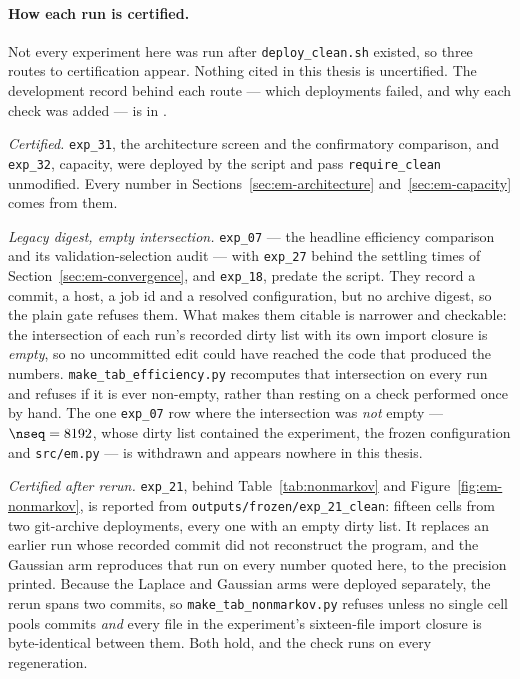 \paragraph{How each run is certified.} Not every experiment here was run after
\texttt{deploy\_clean.sh} existed, so three routes to certification appear.
Nothing cited in this thesis is uncertified. The development record behind each
route --- which deployments failed, and why each check was added --- is in
\compendium{}.

\emph{Certified.} \texttt{exp\_31}, the architecture screen and the
confirmatory comparison, and \texttt{exp\_32}, capacity, were deployed by the
script and pass \texttt{require\_clean} unmodified. Every number in
Sections~\ref{sec:em-architecture} and~\ref{sec:em-capacity} comes from them.

\emph{Legacy digest, empty intersection.} \texttt{exp\_07} --- the headline
efficiency comparison and its validation-selection audit --- with
\texttt{exp\_27} behind the settling times of
Section~\ref{sec:em-convergence}, and \texttt{exp\_18}, predate the script.
They record a commit, a host, a job id and a resolved configuration, but no
archive digest, so the plain gate refuses them. What makes them citable is
narrower and checkable: the intersection of each run's recorded dirty list with
its own import closure is \emph{empty}, so no uncommitted edit could have
reached the code that produced the numbers.
\texttt{make\_tab\_efficiency.py} recomputes that intersection on every run
and refuses if it is ever non-empty, rather than resting on a check performed
once by hand. The one \texttt{exp\_07} row where the intersection was
\emph{not} empty --- $\nseq = 8192$, whose dirty list contained the
experiment, the frozen configuration and \texttt{src/em.py} --- is withdrawn
and appears nowhere in this thesis.

\emph{Certified after rerun.} \texttt{exp\_21}, behind
Table~\ref{tab:nonmarkov} and Figure~\ref{fig:em-nonmarkov}, is reported from
\texttt{outputs/frozen/exp\_21\_clean}: fifteen cells from two git-archive
deployments, every one with an empty dirty list. It replaces an earlier run
whose recorded commit did not reconstruct the program, and the Gaussian arm
reproduces that run on every number quoted here, to the precision printed.
Because the Laplace and Gaussian arms were deployed separately, the rerun spans
two commits, so \texttt{make\_tab\_nonmarkov.py} refuses unless no single cell
pools commits \emph{and} every file in the experiment's sixteen-file import
closure is byte-identical between them. Both hold, and the check runs on every
regeneration.

